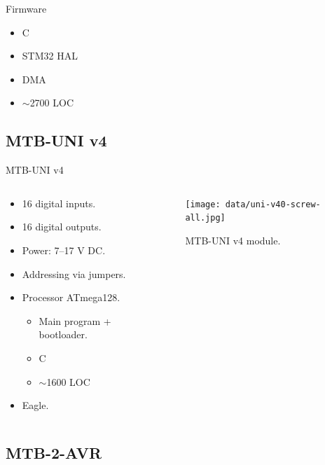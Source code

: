 \documentclass[aspectratio=169]{beamer}
\begin{document}

\begin{frame}{Firmware}
\begin{itemize}
\item C
\item STM32 HAL
\item DMA
\item $\sim$2700 LOC
\end{itemize}
\end{frame}


\subsection{MTB-UNI v4}

\begin{frame}{MTB-UNI v4}
\begin{columns}
	\begin{column}{.5\textwidth}
		\begin{itemize}
		\item 16 digital inputs.
		\item 16 digital outputs.
		\item Power: 7–17 V DC.
		\item Addressing via jumpers.
		\item Processor ATmega128.
		\begin{itemize}
			\item Main program + bootloader.
			\item C
			\item $\sim$1600 LOC
		\end{itemize}
		\item Eagle.
		\end{itemize}
	\end{column}
	\begin{column}{.5\textwidth}
		\begin{figure}
		\texttt{[image: data/uni-v40-screw-all.jpg]}
		\caption{MTB-UNI v4 module.}
		\end{figure}
	\end{column}
\end{columns}
\end{frame}


\subsection{MTB-2-AVR}
\end{document}

